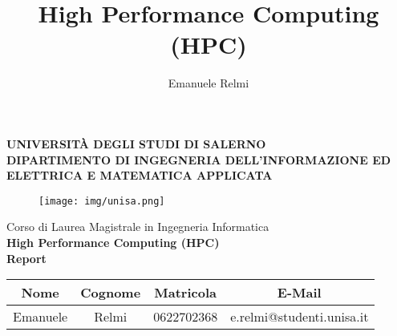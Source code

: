 \documentclass[a4paper, oneside]{book}
\title{High Performance Computing (HPC)}
\author{Emanuele Relmi}
\begin{document}
	\begin{titlepage}
		\begin{center}
			\LARGE{\uppercase{\textbf{Università degli Studi di Salerno}}}\\
			\vspace{5mm}
			\uppercase{\normalsize \textbf{Dipartimento di Ingegneria dell'Informazione ed Elettrica e Matematica Applicata} }\\
		\end{center}
		
		\begin{figure}[H]
			\centering
			\texttt{[image: img/unisa.png]}
		\end{figure}
		
		\begin{center}
			\normalsize{Corso di Laurea Magistrale in Ingegneria Informatica}\\
			\vspace{20mm}
			{\LARGE{\textbf{High Performance Computing (HPC)}}}\\
			\vspace{3mm}
			{\LARGE{\textbf{Report}}}
			\vspace{3mm}
		\end{center}
		
		\vspace{15mm}
		
		\begin{center}
			\begin{tabular}{ | c | c | c | c |}
				\hline
				\textbf{Nome} & \textbf{Cognome} & \textbf{Matricola} & \textbf{E-Mail}           \\ \hline
				Emanuele          & Relmi            & 0622702368         & e.relmi@studenti.unisa.it \\
				\hline
			\end{tabular}
		\end{center}
		
		\vspace{30mm}
		
	
	\end{titlepage}
	
	\tableofcontents
	\clearpage
	\sloppy
	
	
	
	
	
	
	

    \listoftables
    \listoffigures
\end{document}
